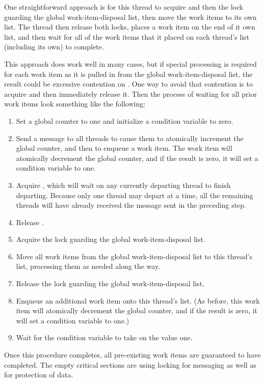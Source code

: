 \begin{enumerate}
	One straightforward approach is for this thread to acquire 
	and then the lock guarding the global work-item-disposal list, then
	move the work items to its own list.
	The thread then release both locks,
	places a work item on the end of it own list,
	and then wait for all of the work items that it placed on each thread's
	list (including its own) to complete.

	This approach does work well in many cases, but if special
	processing is required for each work item as it is pulled in
	from the global work-item-disposal list, the result could be
	excessive contention on .
	One way to avoid that contention is to acquire  and then
	immediately release it.
	Then the process of waiting for all prior work items look
	something like the following:

	\begin{enumerate}
	\item	Set a global counter to one and initialize a condition
		variable to zero.
	\item	Send a message to all threads to cause them to atomically
		increment the global counter, and then to enqueue a
		work item.
		The work item will atomically decrement the global
		counter, and if the result is zero, it will set a
		condition variable to one.
	\item	Acquire , which will wait on any currently departing
		thread to finish departing.
		Because only one thread may depart at a time, all the
		remaining threads will have already received the message
		sent in the preceding step.
	\item	Release .
	\item	Acquire the lock guarding the global work-item-disposal list.
	\item	Move all work items from the global work-item-disposal list
		to this thread's list, processing them as needed along the way.
	\item	Release the lock guarding the global work-item-disposal list.
	\item	Enqueue an additional work item onto this thread's list.
		(As before, this work item will atomically decrement
		the global counter, and if the result is zero, it will
		set a condition variable to one.)
	\item	Wait for the condition variable to take on the value one.
	\end{enumerate}

	Once this procedure completes, all pre-existing work items are
	guaranteed to have completed.
	The empty critical sections are using locking for messaging as
	well as for protection of data.


\end{enumerate}
